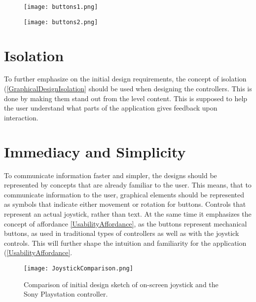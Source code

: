 \begin{figure}[H]
\centering
\begin{minipage}{.5\textwidth}
  \centering
  \texttt{[image: buttons1.png]}
\end{minipage}%
\begin{minipage}{.5\textwidth}
  \centering
  \texttt{[image: buttons2.png]}
\end{minipage}
\end{figure}

\section{Isolation}
To further emphasize on the initial design requirements, the concept of isolation (\ref{GraphicalDesignIsolation} should be used when designing the controllers. This is done by making them stand out from the level content. This is supposed to help the user understand what parts of the application gives feedback upon interaction.

\section{Immediacy and Simplicity}
To communicate information faster and simpler, the designs should be represented by concepts that are already familiar to the user. This means, that to communicate information to the user, graphical elements should be represented as symbols that indicate either movement or rotation for buttons. Controls that represent an actual joystick, rather than
text. At the same time it emphasizes the concept of affordance \ref{UsabilityAffordance}, as the buttons represent mechanical buttons, as used in traditional types of controllers as well as with the joystick controls. This will further shape the intuition and familiarity for the application (\ref{UsabilityAffordance}.

\begin{figure}[H]
\centering
\texttt{[image: JoystickComparison.png]}
\caption{Comparison of initial design sketch of on-screen joystick and the Sony Playstation controller.}
\end{figure}

